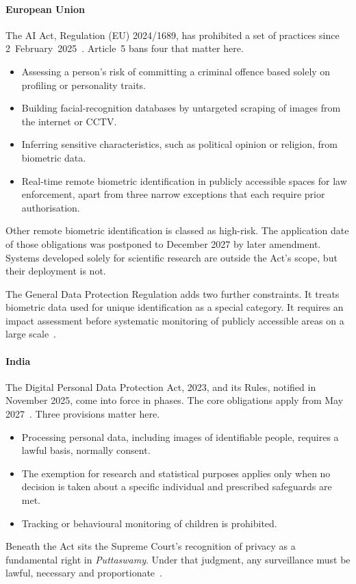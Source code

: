 \paragraph{European Union}
The AI Act, Regulation (EU) 2024/1689, has prohibited a set of practices since
2~February~2025~\citep{euaiact2024}. Article~5 bans four that matter here.
\begin{itemize}
  \item Assessing a person's risk of committing a criminal offence based
        solely on profiling or personality traits.
  \item Building facial-recognition databases by untargeted scraping of
        images from the internet or CCTV.
  \item Inferring sensitive characteristics, such as political opinion or
        religion, from biometric data.
  \item Real-time remote biometric identification in publicly accessible
        spaces for law enforcement, apart from three narrow exceptions that
        each require prior authorisation.
\end{itemize}
Other remote biometric identification is classed as high-risk. The
application date of those obligations was postponed to December 2027 by
later amendment\unv. Systems developed solely for scientific research are
outside the Act's scope, but their deployment is not.

The General Data Protection Regulation adds two further constraints. It
treats biometric data used for unique identification as a special category.
It requires an impact assessment before systematic monitoring of publicly
accessible areas on a large scale~\citep{gdpr2016}.

\paragraph{India}
The Digital Personal Data Protection Act, 2023, and its Rules, notified in
November 2025, come into force in phases. The core obligations apply from
May 2027\unv~\citep{dpdp2023,dpdprules2025}. Three provisions matter here.
\begin{itemize}
  \item Processing personal data, including images of identifiable people,
        requires a lawful basis, normally consent.
  \item The exemption for research and statistical purposes applies only
        when no decision is taken about a specific individual and prescribed
        safeguards are met.
  \item Tracking or behavioural monitoring of children is prohibited.
\end{itemize}
Beneath the Act sits the Supreme Court's recognition of privacy as a
fundamental right in \emph{Puttaswamy}. Under that judgment, any
surveillance must be lawful, necessary and proportionate~\citep{puttaswamy2017}.

